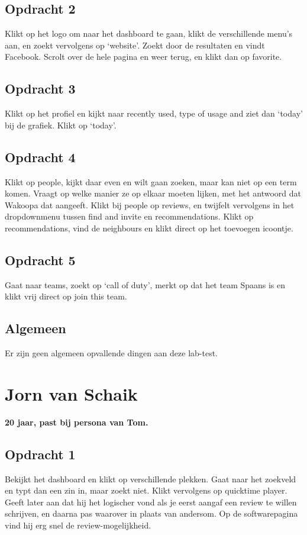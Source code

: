 \subsection{Opdracht 2}
Klikt op het logo om naar het dashboard te gaan, klikt de verschillende menu's aan, en zoekt vervolgens op `website'. Zoekt door de resultaten en vindt Facebook. Scrolt over de hele pagina en weer terug, en klikt dan op favorite.

\subsection{Opdracht 3}
Klikt op het profiel en kijkt naar recently used, type of usage and ziet dan `today' bij de grafiek. Klikt op `today'.

\subsection{Opdracht 4}
Klikt op people, kijkt daar even en wilt gaan zoeken, maar kan niet op een term komen. Vraagt op welke manier ze op elkaar moeten lijken, met het antwoord dat Wakoopa dat aangeeft. Klikt bij people op reviews, en twijfelt vervolgens in het dropdownmenu tussen find and invite en recommendations. Klikt op recommendations, vind de neighbours en klikt direct op het toevoegen icoontje.

\subsection{Opdracht 5}
Gaat naar teams, zoekt op `call of duty', merkt op dat het team Spaans is en klikt vrij direct op join this team.

\subsection{Algemeen}
Er zijn geen algemeen opvallende dingen aan deze lab-test.

\section{Jorn van Schaik}
\textbf{20 jaar, past bij persona van Tom.}

\subsection{Opdracht 1}
Bekijkt het dashboard en klikt op verschillende plekken. Gaat naar het zoekveld en typt dan een zin in, maar zoekt niet. Klikt vervolgens op quicktime player. Geeft later aan dat hij het logischer vond als je eerst aangaf een review te willen schrijven, en daarna pas waarover in plaats van andersom. Op de softwarepagina vind hij erg snel de review-mogelijkheid.

